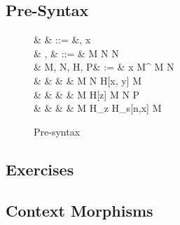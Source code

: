 \documentclass{article}
\begin{document}
\subsection{Pre-Syntax}

\begin{figure}[H]
\centering
\begin{doublesyntax}
 & \Gamma & ::= &\diamond \mid \Gamma, x\co\sigma\\
 & \sigma, \tau & ::= & \tau %
           \mid {} \tau \mid \IdTy\sigma M N \mid N\\
 & M, N, H, P& := %
  & x \mid {} M^\tau \mid \PiAppTm {\tau[x\co\sigma]} M N\\%
  & & & & \mid \SigmaPair {\tau[x\co\sigma]} M N %
          \mid {} {H[x\co\sigma, y\co\tau]} {M}\\ %
  & & & & \mid \Refl \sigma M%
  \mid {} {H[z\co\sigma]} M N P \\ %
  & & & &  %
  \mid \Suc M \mid \RecNat {\sigma[n\co\NatTy]} {H_z} {H_s[n\co\NatTy,x\co\sigma]} M
\end{doublesyntax}
\caption{Pre-syntax}
\end{figure}
\subsection*{Exercises}


\subsection{Context Morphisms}
\end{document}
